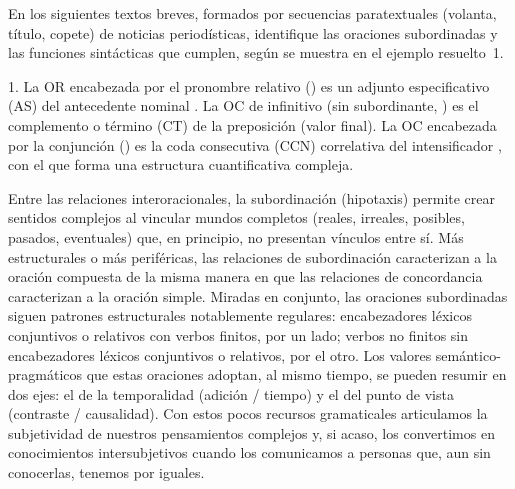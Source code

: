 \begin{ejercicio}\label{ej:13-paratextos}
En los siguientes textos breves, formados por secuencias paratextuales (volanta,
título, copete) de noticias periodísticas, identifique las oraciones
subordinadas y las funciones sintácticas que cumplen, según se muestra en el
ejemplo resuelto~1.


\begin{resuelto}
1. La OR encabezada por el pronombre relativo  () es un adjunto especificativo (AS) del antecedente
nominal . La OC de infinitivo (sin subordinante, )
es el complemento o término (CT) de la preposición  (valor final). La
OC encabezada por la conjunción  () es la
coda consecutiva (CCN) correlativa del intensificador , con el que
forma una estructura cuantificativa compleja.
\end{resuelto}
\end{ejercicio}

\begin{recuadro}
Entre las relaciones interoracionales, la subordinación (hipotaxis) permite crear
sentidos complejos al vincular mundos completos (reales, irreales, posibles,
pasados, eventuales) que, en principio, no presentan vínculos entre sí. Más
estructurales o más periféricas, las relaciones de subordinación caracterizan a
la oración compuesta de la misma manera en que las relaciones de concordancia
caracterizan a la oración simple. Miradas en conjunto, las oraciones subordinadas
siguen patrones estructurales notablemente regulares: encabezadores léxicos
conjuntivos o relativos con verbos finitos, por un lado; verbos no finitos sin
encabezadores léxicos conjuntivos o relativos, por el otro. Los valores
semántico-pragmáticos que estas oraciones adoptan, al mismo tiempo, se pueden
resumir en dos ejes: el de la temporalidad (adición / tiempo) y el del punto de
vista (contraste / causalidad). Con estos pocos recursos gramaticales
articulamos la subjetividad de nuestros pensamientos complejos y, si acaso, los
convertimos en conocimientos intersubjetivos cuando los comunicamos a personas
que, aun sin conocerlas, tenemos por iguales.
\end{recuadro}

